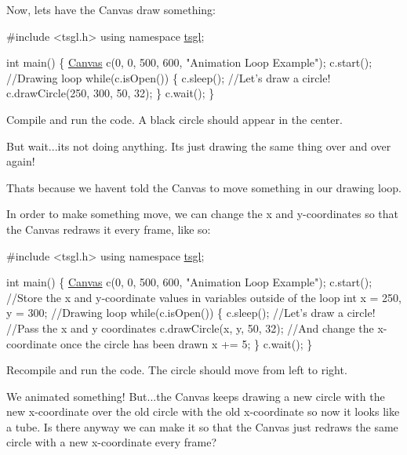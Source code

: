 Now, let\textquotesingle{}s have the Canvas draw something\+:


\begin{DoxyCode}
\textcolor{preprocessor}{#include <tsgl.h>}
\textcolor{keyword}{using namespace }\hyperlink{namespacetsgl}{tsgl};

\textcolor{keywordtype}{int} main() \{
  \hyperlink{classtsgl_1_1_canvas}{Canvas} c(0, 0, 500, 600, \textcolor{stringliteral}{"Animation Loop Example"});
  c.start();
  \textcolor{comment}{//Drawing loop}
  \textcolor{keywordflow}{while}(c.isOpen()) \{
    c.sleep();
    \textcolor{comment}{//Let's draw a circle!}
    c.drawCircle(250, 300, 50, 32);
  \}
  c.wait();
\}
\end{DoxyCode}


Compile and run the code. A black circle should appear in the center.

But wait...it\textquotesingle{}s not doing anything. It\textquotesingle{}s just drawing the same thing over and over again!

That\textquotesingle{}s because we haven\textquotesingle{}t told the Canvas to move something in our drawing loop.

In order to make something move, we can change the x and y-\/coordinates so that the Canvas redraws it every frame, like so\+:


\begin{DoxyCode}
\textcolor{preprocessor}{#include <tsgl.h>}
\textcolor{keyword}{using namespace }\hyperlink{namespacetsgl}{tsgl};

\textcolor{keywordtype}{int} main() \{
  \hyperlink{classtsgl_1_1_canvas}{Canvas} c(0, 0, 500, 600, \textcolor{stringliteral}{"Animation Loop Example"});
  c.start();
  \textcolor{comment}{//Store the x and y-coordinate values in variables outside of the loop}
  \textcolor{keywordtype}{int} x = 250, y = 300;
  \textcolor{comment}{//Drawing loop}
  \textcolor{keywordflow}{while}(c.isOpen()) \{
    c.sleep();
    \textcolor{comment}{//Let's draw a circle!}
    \textcolor{comment}{//Pass the x and y coordinates}
    c.drawCircle(x, y, 50, 32);
    \textcolor{comment}{//And change the x-coordinate once the circle has been drawn}
    x += 5;
  \}
  c.wait();
\}
\end{DoxyCode}
 Recompile and run the code. The circle should move from left to right.

We animated something! But...the Canvas keeps drawing a new circle with the new x-\/coordinate over the old circle with the old x-\/coordinate so now it looks like a tube. Is there anyway we can make it so that the Canvas just redraws the same circle with a new x-\/coordinate every frame?


